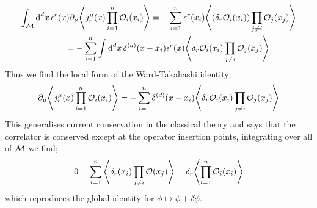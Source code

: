 \begin{align*}
\int_{\mM}{\upd{^d x}\epsilon^r(x)\del_\mu\left< j_r^{\mu}(x)\prod_{i = 1}^{n}{\mO_i(x_i)} \right>} &= -\sum_{i = 1}^{n}{\epsilon^r(x_i)\left< \left(\delta_r \mO_i(x_i)\right)\prod_{j \neq i}{\mO_j(x_j)} \right>} \\
&\hspace{-100pt}= -\sum_{i = 1}^{n}\int{\upd{^d x}\delta^{(d)}(x - x_i)\epsilon^r(x)\left< \delta_r \mO_i(x_i)\prod_{j \neq i}{\mO_j(x_j)} \right>}
\end{align*}
Thus we find the local form of the Ward-Takahashi identity;
\begin{equation}
\del_\mu\left< j^\mu_r(x)\prod_{i = 1}^{n}{\mO_i(x_i)} \right> = -\sum_{i = 1}^{n}{\delta^{(d)}(x - x_i)\left< \delta_r\mO_i(x_i)\prod_{j \neq i}{\mO_j(x_j)} \right>}
\end{equation}
This generalises current conservation in the classical theory and says that the correlator is conserved except at the operator insertion points, integrating over all of $\mathcal{M}$ we find;
\begin{equation*}
0 = \sum_{i = 1}^{n}{\left< \delta_r(x_i)\prod_{j \neq i}{\mO(x_j)} \right>} = \delta_r\left< \prod_{i = 1}^{n}{\mO_i(x_i)} \right>
\end{equation*}
which reproduces the global identity for $\phi \mapsto \phi + \delta \phi$.

